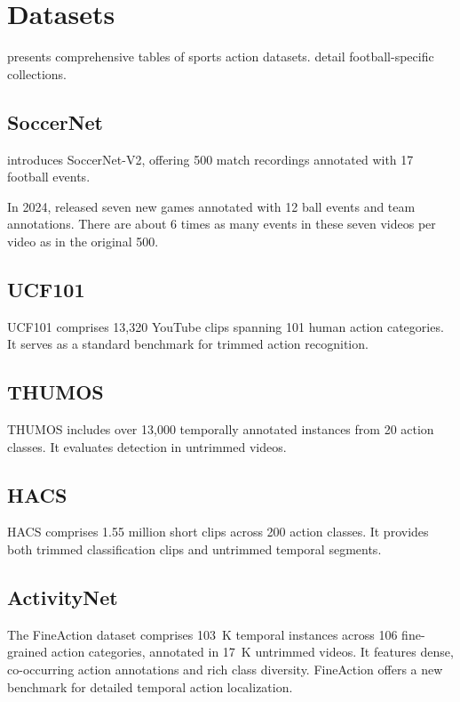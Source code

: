 \section{Datasets}
\label{sec:datasets}

\textcite{survey_of_survey} presents comprehensive tables of sports action datasets. \textcite{seweryn_survey_2023} detail football-specific collections.

\subsection{SoccerNet}

\textcite{deliege_soccernet-v2_dataset_2021} introduces SoccerNet-V2, offering 500 match recordings annotated with 17 football events.

In 2024, \textcite{deliege_soccernet-v2_dataset_2021} released seven new games annotated with 12 ball events and team annotations. There are about 6 times as many events in these seven videos per video as in the original 500. 

\subsection{UCF101}
UCF101 \cite{dataset:UCF101} comprises 13,320 YouTube clips spanning 101 human action categories. It serves as a standard benchmark for trimmed action recognition.

\subsection{THUMOS}
THUMOS \cite{dataset:thumos} includes over 13,000 temporally annotated instances from 20 action classes. It evaluates detection in untrimmed videos.

\subsection{HACS}
HACS \cite{dataset:hacs} comprises 1.55 million short clips across 200 action classes. It provides both trimmed classification clips and untrimmed temporal segments.

\subsection{ActivityNet}
The FineAction dataset \cite{dataset:fineaction} comprises 103\, K temporal instances across 106 fine-grained action categories, annotated in 17\, K untrimmed videos. It features dense, co-occurring action annotations and rich class diversity. FineAction offers a new benchmark for detailed temporal action localization.


